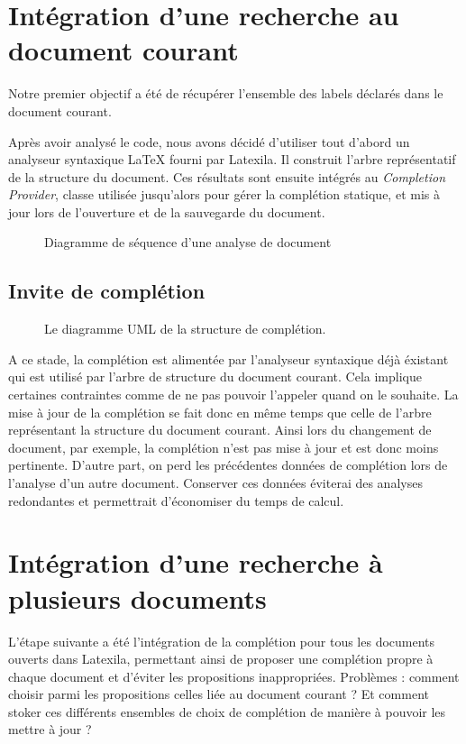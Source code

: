\documentclass[a4paper,11pt]{report}
\begin{document}
\section{Intégration d'une recherche au document courant}
Notre premier objectif a été de récupérer l'ensemble des labels déclarés dans le document courant.

Après avoir analysé le code, nous avons décidé d'utiliser tout d'abord un analyseur syntaxique \LaTeX{} fourni par Latexila. Il construit l'arbre représentatif de la structure du document.
Ces résultats sont ensuite intégrés au \textit{Completion Provider}, classe utilisée jusqu'alors pour gérer la complétion statique, et mis à jour lors de l'ouverture et de la sauvegarde du document.

\begin{figure}[h]
\label{fig:doc_opening}
\centering

\caption{Diagramme de séquence d'une analyse de document}
\end{figure}

\subsection{Invite de complétion}
\begin{figure}[h!]
\label{fig:uml_completion_structure}
\centering

\caption{Le diagramme UML de la structure de complétion.}
\end{figure}

A ce stade, la complétion est alimentée par l'analyseur syntaxique déjà éxistant qui est utilisé par l'arbre de structure du document courant. 
Cela implique certaines contraintes comme de ne pas pouvoir l'appeler quand on le souhaite.
La mise à jour de la complétion se fait donc en même temps que celle de l'arbre représentant la structure du document courant. 
Ainsi lors du changement de document, par exemple, la complétion n'est pas mise à jour et est donc moins pertinente.
D'autre part, on perd les précédentes données de complétion lors de l'analyse d'un autre document.
Conserver ces données éviterai des analyses redondantes et permettrait d'économiser du temps de calcul.

\section{Intégration d'une recherche à plusieurs documents}
L'étape suivante a été l'intégration de la complétion pour tous les documents ouverts dans Latexila, permettant ainsi de proposer une complétion propre à chaque document et d'éviter les propositions inappropriées.
Problèmes : comment choisir parmi les propositions celles liée au document courant ? Et comment stoker ces différents ensembles de choix de complétion de manière à pouvoir les mettre à jour ?
\end{document}

